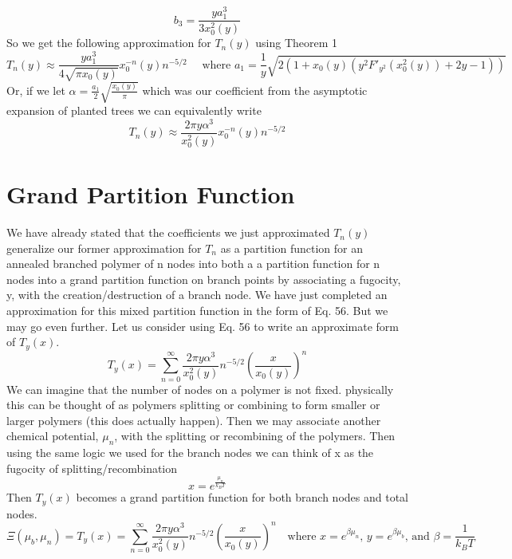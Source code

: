 \documentclass{article}
\begin{document}
\begin{equation}
b_3=\frac{ya_1^3}{3x_0^2(y)}
\end{equation}
So we get the following approximation for \(T_n(y)\) using Theorem 1
\begin{equation}
T_n(y) \approx \frac{ya_1^3}{4\sqrt{\pi x_0(y)}}x_0^{-n}(y)n^{-5/2} \quad \text{ where }a_1=\frac{1}{y}\sqrt{2(1+x_0(y)(y^2F'_{y^2}(x_0^2(y))+2y-1))}
\end{equation}
Or, if we let \(\alpha = \frac{a_1}{2}\sqrt{\frac{x_0(y)}{\pi}}\) which was our coefficient from the asymptotic expansion of planted trees we can equivalently write
\begin{equation}
T_n(y) \approx \frac{2\pi y \alpha^3}{x_0^2(y)}x_0^{-n}(y)n^{-5/2}
\end{equation}

\section{Grand Partition Function}
We have already stated that the coefficients we just approximated \(T_n(y)\) generalize our former approximation for \(T_n\) as a partition function for an annealed branched polymer of n nodes into both a a partition function for n nodes into a grand partition function on branch points by associating a fugocity, y, with the creation/destruction of a branch node. We have just completed an approximation for this mixed partition function in the form of Eq. 56. But we may go even further. Let us consider using Eq. 56 to write an approximate form of \(T_y(x)\).
\begin{equation}
T_y(x)=\sum_{n=0}^\infty  \frac{2\pi y \alpha^3}{x_0^2(y)}n^{-5/2} \left(\frac{x}{x_0(y)}\right)^n
\end{equation}
We can imagine that the number of nodes on a polymer is not fixed. physically this can be thought of as polymers splitting or combining to form smaller or larger polymers (this does actually happen). Then we may associate another chemical potential, \(\mu_n\), with the splitting or recombining of the polymers. Then using the same logic we used for the branch nodes we can think of x as the fugocity of splitting/recombination
\begin{equation}
x=e^{\frac{\mu_n}{k_BT}}
\end{equation}
Then \(T_y(x)\) becomes a grand partition function for both branch nodes and total nodes.
\begin{equation}
\Xi(\mu_b,\mu_n)=T_y(x)=\sum_{n=0}^\infty  \frac{2\pi y \alpha^3}{x_0^2(y)}n^{-5/2} \left(\frac{x}{x_0(y)}\right)^n \quad \text{where } x=e^{\beta \mu_n}\text{, } y=e^{\beta \mu_b}\text{, and  } \beta=\frac{1}{k_BT}
\end{equation}
\end{document}
